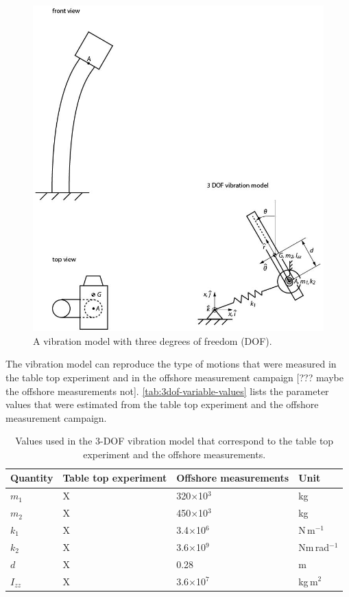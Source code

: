 \documentclass{article}
\begin{document}
\begin{figure}
    \centering
    \includegraphics{manuscript/figures/vibration_model.jpg}
    \caption{A vibration model with three degrees of freedom (DOF).}
    \label{fig:3dof-system}
\end{figure}

The vibration model can reproduce the type of motions that were measured in the table top experiment and in the offshore measurement campaign [??? maybe the offshore measurements not]. \autoref{tab:3dof-variable-values} lists the parameter values that were estimated from the table top experiment and the offshore measurement campaign.

\begin{table}[]
    \centering
    \begin{tabular}{l l l l}
    \toprule
         Quantity & Table top experiment & Offshore measurements & Unit \\
         \midrule
         $m_1$ & X & 320$\times$10$^3$ & kg\\ 
         $m_2$ & X & 450$\times$10$^3$ & kg\\ 
         $k_1$ & X & 3.4$\times$10$^6$ & N\,m$^{-1}$ \\ 
         $k_2$ & X & 3.6$\times$10$^9$ & Nm\,rad$^{-1}$ \\ 
         $d$ & X & 0.28 & m\\ 
         $I_{zz}$ & X & 3.6$\times$10$^7$ & kg\,m$^2$ \\ 
         \bottomrule
    \end{tabular}
    \caption{Values used in the 3-DOF vibration model that correspond to the table top experiment and the offshore measurements.}
    \label{tab:3dof-variable-values}
\end{table}
\end{document}
